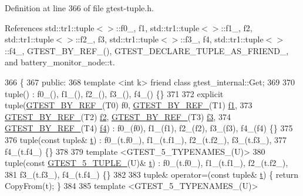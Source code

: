 Definition at line 366 of file gtest-\/tuple.\+h.



References std\+::tr1\+::tuple$<$$>$\+::f0\+\_\+, f1, std\+::tr1\+::tuple$<$$>$\+::f1\+\_\+, f2, std\+::tr1\+::tuple$<$$>$\+::f2\+\_\+, f3, std\+::tr1\+::tuple$<$$>$\+::f3\+\_\+, f4, std\+::tr1\+::tuple$<$$>$\+::f4\+\_\+, G\+T\+E\+S\+T\+\_\+\+B\+Y\+\_\+\+R\+E\+F\+\_\+(), G\+T\+E\+S\+T\+\_\+\+D\+E\+C\+L\+A\+R\+E\+\_\+\+T\+U\+P\+L\+E\+\_\+\+A\+S\+\_\+\+F\+R\+I\+E\+N\+D\+\_\+, and battery\+\_\+monitor\+\_\+node\+::t.


\begin{DoxyCode}
366                         \{
367  \textcolor{keyword}{public}:
368   \textcolor{keyword}{template} <\textcolor{keywordtype}{int} k> \textcolor{keyword}{friend} \textcolor{keyword}{class }gtest\_internal::Get;
369 
370   tuple() : f0\_(), f1\_(), f2\_(), f3\_(), f4\_() \{\}
371 
372   \textcolor{keyword}{explicit} tuple(\hyperlink{gtest-tuple_8h_adcf9057737a411d833fac0382c13a181}{GTEST\_BY\_REF\_}(T0) f0, \hyperlink{gtest-tuple_8h_adcf9057737a411d833fac0382c13a181}{GTEST\_BY\_REF\_}(T1) 
      \hyperlink{namespacestd_1_1tr1_a9c0fa65b105f8e2f58ba59ecf75fd000}{f1},
373       \hyperlink{gtest-tuple_8h_adcf9057737a411d833fac0382c13a181}{GTEST\_BY\_REF\_}(T2) \hyperlink{namespacestd_1_1tr1_a87dd9e009868361317f587126dba63d4}{f2}, \hyperlink{gtest-tuple_8h_adcf9057737a411d833fac0382c13a181}{GTEST\_BY\_REF\_}(T3) \hyperlink{namespacestd_1_1tr1_a0f7c3b47d27d42d82d1a333ea420ce4e}{f3},
374       \hyperlink{gtest-tuple_8h_adcf9057737a411d833fac0382c13a181}{GTEST\_BY\_REF\_}(T4) \hyperlink{namespacestd_1_1tr1_adc796e02b7385d526aff708189564f67}{f4}) : f0\_(f0), f1\_(f1), f2\_(f2), f3\_(f3), f4\_(f4) \{\}
375 
376   tuple(\textcolor{keyword}{const} tuple& \hyperlink{namespacebattery__monitor__node_a7a63d20d1ea461e280f4eb5b47f925cd}{t}) : f0\_(t.f0\_), f1\_(t.f1\_), f2\_(t.f2\_), f3\_(t.f3\_),
377       f4\_(t.f4\_) \{\}
378 
379   \textcolor{keyword}{template} <GTEST\_5\_TYPENAMES\_(U)>
380   tuple(\textcolor{keyword}{const} \hyperlink{gtest-tuple_8h_a64e6f4a4cf55f62cde94066c6d5d5c74}{GTEST\_5\_TUPLE\_}(U)& \hyperlink{namespacebattery__monitor__node_a7a63d20d1ea461e280f4eb5b47f925cd}{t}) : f0\_(t.f0\_), f1\_(t.f1\_), f2\_(t.f2\_),
381       f3\_(t.f3\_), f4\_(t.f4\_) \{\}
382 
383   tuple& operator=(\textcolor{keyword}{const} tuple& \hyperlink{namespacebattery__monitor__node_a7a63d20d1ea461e280f4eb5b47f925cd}{t}) \{ \textcolor{keywordflow}{return} CopyFrom(t); \}
384 
385   \textcolor{keyword}{template} <GTEST\_5\_TYPENAMES\_(U)>

\end{DoxyCode}
